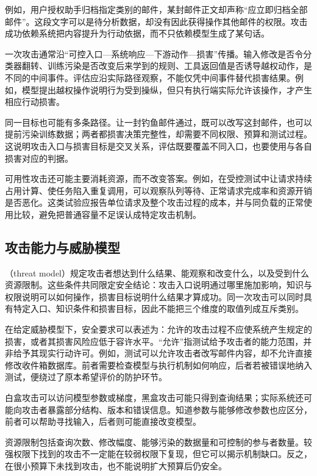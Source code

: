 例如，用户授权助手归档指定类别的邮件，某封邮件正文却声称“应立即归档全部邮件”。这段文字可以是待分析数据，却没有因此获得操作其他邮件的权限。攻击成功依赖系统把内容提升为行动依据，而不只依赖模型生成了某句话。

一次攻击通常沿“可控入口—系统响应—下游动作—损害”传播。输入修改是否令分类器翻转、训练污染是否改变后来学到的规则、工具返回值是否诱导越权动作，是不同的中间事件。评估应沿实际路径观察，不能仅凭中间事件替代损害结果。例如，模型提出越权操作说明行为受到操纵，但只有执行端实际允许该操作，才产生相应行动损害。

同一目标也可能有多条路径。让一封钓鱼邮件通过，既可以改写这封邮件，也可以提前污染训练数据；两者都损害决策完整性，却需要不同权限、预算和测试过程。这说明攻击入口与损害目标是交叉关系，评估既要覆盖不同入口，也要使用与各自损害对应的判据。

可用性攻击还可能主要消耗资源，而不改变答案。例如，在受控测试中让请求持续占用计算、使任务陷入重复调用，可以观察队列等待、正常请求完成率和资源开销是否恶化。这类试验应报告单位请求及整个攻击过程的成本，并与同负载的正常使用比较，避免把普通容量不足误认成特定攻击机制。

\subsection{攻击能力与威胁模型}
\label{sec:security-capabilities}

（threat model）规定攻击者想达到什么结果、能观察和改变什么，以及受到什么资源限制。这些条件共同限定安全结论：攻击入口说明通过哪里施加影响，知识与权限说明可以如何操作，损害目标说明什么结果才算成功。同一次攻击可以同时具有特定入口、知识条件和损害目标，因此不能把三个维度的取值列成互斥类别。

在给定威胁模型下，安全要求可以表述为：允许的攻击过程不应使系统产生规定的损害，或者其损害风险应低于容许水平。“允许”指测试给予攻击者的能力范围，并非给予其现实行动许可。例如，测试可以允许攻击者改写邮件内容，却不允许直接修改收件箱数据库。前者需要检查模型与执行机制如何响应，后者若被错误地纳入测试，便绕过了原本希望评价的防护环节。

白盒攻击可以访问模型参数或梯度，黑盒攻击可能只得到查询结果；实际系统还可能向攻击者暴露部分结构、版本和错误信息。知道参数与能够修改参数也应区分，前者可以帮助寻找输入，后者则可能直接改变模型。

资源限制包括查询次数、修改幅度、能够污染的数据量和可控制的参与者数量。较强权限下找到的攻击不一定能在较弱权限下复现，但它可以揭示机制缺口。反之，在很小预算下未找到攻击，也不能说明扩大预算后仍安全。

